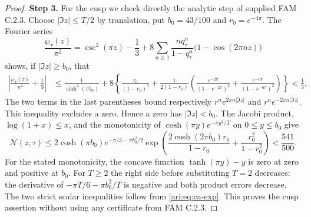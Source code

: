 \documentclass[11pt,a4paper]{article}
\theoremstyle{plain}
\theoremstyle{definition}
\begin{document}
\begin{proof}
\noindent\textbf{Step 3.} For the cusp we check directly the analytic step of supplied FAM C.2.3.
Choose $|\Im z|\le T/2$ by translation, put $b_0=43/100$ and
$r_0=e^{-4\pi}$. The Fourier series
\[
 \frac{\wp_\tau(z)}{\pi^2}
 =\csc^2(\pi z)-\frac13
   +8\sum_{n\ge1}\frac{nq_\tau^n}{1-q_\tau^n}
          \bigl(1-\cos(2\pi nz)\bigr)
\]
shows, if $|\Im z|\ge b_0$, that
\begin{align*}
 \left|\frac{\wp_\tau(z)}{\pi^2}+\frac13\right|
 &\le \frac1{\sinh^2(\pi b_0)}
 +8\left\{\frac{r_0}{(1-r_0)^3}
 +\frac1{2(1-r_0)}
 \left(\frac{e^{-2\pi}}{(1-e^{-2\pi})^2}
       +\frac{e^{-6\pi}}{(1-e^{-6\pi})^2}\right)\right\}
 <\frac13.
\end{align*}
The two terms in the last parentheses bound respectively
$r^n e^{2\pi n|\Im z|}$ and $r^n e^{-2\pi n|\Im z|}$.
This inequality excludes a zero. Hence a zero has
$|\Im z|<b_0$. The Jacobi product, $\log(1+x)\le x$, and
the monotonicity of $\cosh(\pi y)e^{-\pi y^2/T}$ on
$0\le y\le b_0$ give
\[
 \mathcal N(z,\tau)\le
 2\cosh(\pi b_0)e^{-\pi/3-\pi b_0^2/2}
 \exp\!\left(
 \frac{2\cosh(2\pi b_0)r_0}{1-r_0}
 +\frac{r_0^2}{1-r_0^2}\right)<\frac{541}{500}.
\]
For the stated monotonicity, the concave function
$\tanh(\pi y)-y$ is zero at zero and positive at $b_0$.
For $T\ge2$ the right side before substituting $T=2$ decreases:
the derivative of $-\pi T/6-\pi b_0^2/T$ is negative and
both product errors decrease. The two strict scalar inequalities
follow from \eqref{ari:eq:ca-exp}. This proves the cusp assertion
without using any certificate from FAM C.2.3.
\end{proof}
\end{document}
